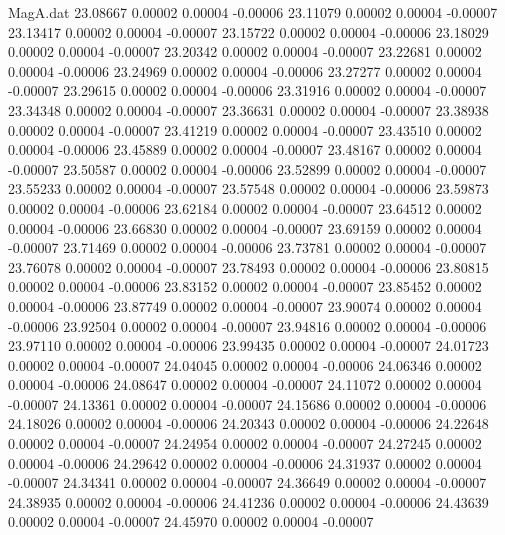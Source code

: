 \begin{filecontents}{MagA.dat}
  23.08667    0.00002    0.00004   -0.00006
  23.11079    0.00002    0.00004   -0.00007
  23.13417    0.00002    0.00004   -0.00007
  23.15722    0.00002    0.00004   -0.00006
  23.18029    0.00002    0.00004   -0.00007
  23.20342    0.00002    0.00004   -0.00007
  23.22681    0.00002    0.00004   -0.00006
  23.24969    0.00002    0.00004   -0.00006
  23.27277    0.00002    0.00004   -0.00007
  23.29615    0.00002    0.00004   -0.00006
  23.31916    0.00002    0.00004   -0.00007
  23.34348    0.00002    0.00004   -0.00007
  23.36631    0.00002    0.00004   -0.00007
  23.38938    0.00002    0.00004   -0.00007
  23.41219    0.00002    0.00004   -0.00007
  23.43510    0.00002    0.00004   -0.00006
  23.45889    0.00002    0.00004   -0.00007
  23.48167    0.00002    0.00004   -0.00007
  23.50587    0.00002    0.00004   -0.00006
  23.52899    0.00002    0.00004   -0.00007
  23.55233    0.00002    0.00004   -0.00007
  23.57548    0.00002    0.00004   -0.00006
  23.59873    0.00002    0.00004   -0.00006
  23.62184    0.00002    0.00004   -0.00007
  23.64512    0.00002    0.00004   -0.00006
  23.66830    0.00002    0.00004   -0.00007
  23.69159    0.00002    0.00004   -0.00007
  23.71469    0.00002    0.00004   -0.00006
  23.73781    0.00002    0.00004   -0.00007
  23.76078    0.00002    0.00004   -0.00007
  23.78493    0.00002    0.00004   -0.00006
  23.80815    0.00002    0.00004   -0.00006
  23.83152    0.00002    0.00004   -0.00007
  23.85452    0.00002    0.00004   -0.00006
  23.87749    0.00002    0.00004   -0.00007
  23.90074    0.00002    0.00004   -0.00006
  23.92504    0.00002    0.00004   -0.00007
  23.94816    0.00002    0.00004   -0.00006
  23.97110    0.00002    0.00004   -0.00006
  23.99435    0.00002    0.00004   -0.00007
  24.01723    0.00002    0.00004   -0.00007
  24.04045    0.00002    0.00004   -0.00006
  24.06346    0.00002    0.00004   -0.00006
  24.08647    0.00002    0.00004   -0.00007
  24.11072    0.00002    0.00004   -0.00007
  24.13361    0.00002    0.00004   -0.00007
  24.15686    0.00002    0.00004   -0.00006
  24.18026    0.00002    0.00004   -0.00006
  24.20343    0.00002    0.00004   -0.00006
  24.22648    0.00002    0.00004   -0.00007
  24.24954    0.00002    0.00004   -0.00007
  24.27245    0.00002    0.00004   -0.00006
  24.29642    0.00002    0.00004   -0.00006
  24.31937    0.00002    0.00004   -0.00007
  24.34341    0.00002    0.00004   -0.00007
  24.36649    0.00002    0.00004   -0.00007
  24.38935    0.00002    0.00004   -0.00006
  24.41236    0.00002    0.00004   -0.00006
  24.43639    0.00002    0.00004   -0.00007
  24.45970    0.00002    0.00004   -0.00007

\end{filecontents}
